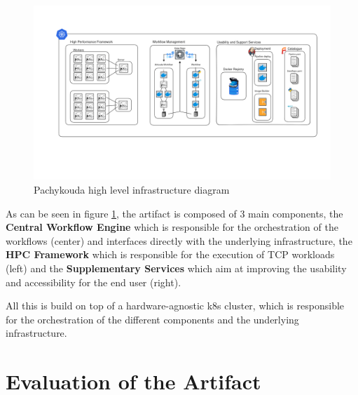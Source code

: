 \begin{figure}[htb]
    \centering
    \includegraphics[width=16cm]{graphics/pachykouda_three_aspects.png}
    \caption[Pachykouda high level diagram showing three main aspects]{Pachykouda high level infrastructure diagram}
    \label{abb:pachykouda_three_aspects}
\end{figure}


As can be seen in figure \ref{abb:pachykouda_three_aspects}, the artifact is composed of 3 main components, 
the \textbf{Central Workflow Engine} which is responsible for the orchestration of the workflows (center) and interfaces directly with the underlying infrastructure,
the \textbf{\ac{HPC} Framework} which is responsible for the execution of \ac{TCP} workloads (left)
and the \textbf{Supplementary Services} which aim at improving the usability and accessibility for the end user (right).

All this is build on top of a hardware-agnostic \ac{k8s} cluster, which is responsible for the orchestration of the different components and the underlying infrastructure.

\newpage






\section{Evaluation of the Artifact}

\newpage
